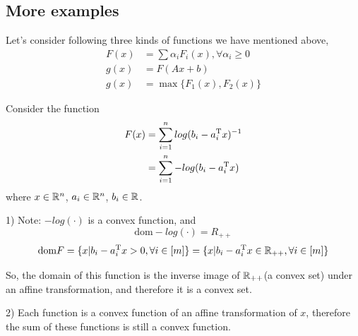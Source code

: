 \subsection{More examples}
Let's consider following three kinds of functions we have mentioned above,
\begin{align*}
F(x) &=\sum\alpha_iF_i(x), \forall \alpha_i\geq 0\\
g(x) &= F(Ax + b)\\
g(x) &=\max\{F_1(x), F_2(x) \}
\end{align*}

\begin{example} Consider the function 
\begin{align*}
F(x) 
&= \sum^{n}_{i=1}log(b_i - a_i^{{\rm T}}x)^{-1}\\
&=\sum^n_{i=1}-log(b_i - a_i^{{\rm T}}x)
\end{align*}
where $x \in \mathbb{R}^n$, $a_i\in \mathbb{R}^n$, $b_i\in \mathbb{R}$.

1) Note: $-log(\cdot)$ is a convex function, and 
$$\text{dom}-log(\cdot) = R_{++}$$
$$\text{dom}F = \{x|b_i - a_i^{{\rm T}}x >0, \forall i\in [m] \} =\{x|b_i - a_i^{{\rm T}}x \in \mathbb{R}_{++}, \forall i\in [m]\}$$ 

So, the domain of this function is the inverse image of $\mathbb{R}_{++}$(a convex set) under an affine transformation, and therefore it is a convex set. 

2) Each function is a convex function of an affine transformation of $x$, therefore the sum of these functions is still a convex function.
\end{example}

